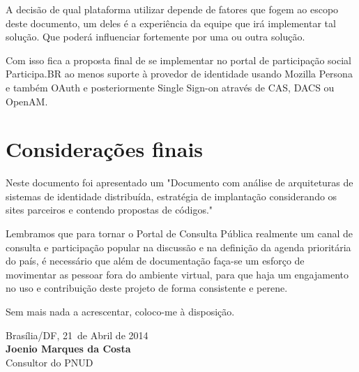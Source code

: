 \documentclass[11pt]{article}
\newcommand{\MyName}{Joenio Marques da Costa}
\newcommand{\ProductDescription}{"Documento com análise de arquiteturas de
        sistemas de identidade distribuída, estratégia de implantação
        considerando os sites parceiros e contendo propostas de códigos."
}
\newcommand{\MesEntrega}{Abril de 2014}
\newcommand{\DiaEntrega}{21}
\begin{document}
A decisão de qual plataforma utilizar depende de fatores que fogem ao escopo
deste documento, um deles é a experiência da equipe que irá implementar tal
solução. Que poderá influenciar fortemente por uma ou outra solução.

Com isso fica a proposta final de se implementar no portal de participação
social Participa.BR ao menos suporte à provedor de identidade usando Mozilla
Persona e também OAuth e posteriormente Single Sign-on através de CAS, DACS ou
OpenAM.

\section{Considerações finais}

Neste documento foi apresentado um \ProductDescription

Lembramos que para tornar o Portal de Consulta Pública realmente um canal de
consulta e participação popular na discussão e na definição da agenda
prioritária do país, é necessário que além de documentação faça-se um esforço
de movimentar as pessoar fora do ambiente virtual, para que haja um
engajamento no uso e contribuição deste projeto de forma consistente e perene.

\vspace{1cm}

Sem mais nada a acrescentar, coloco-me à disposição.

\vspace{1cm}

\begin{minipage}{\textwidth}
  Brasília/DF, \DiaEntrega \ de \MesEntrega\\[1cm]
  \textbf{\MyName}\\
  \small Consultor do PNUD
\end{minipage}
\end{document}
